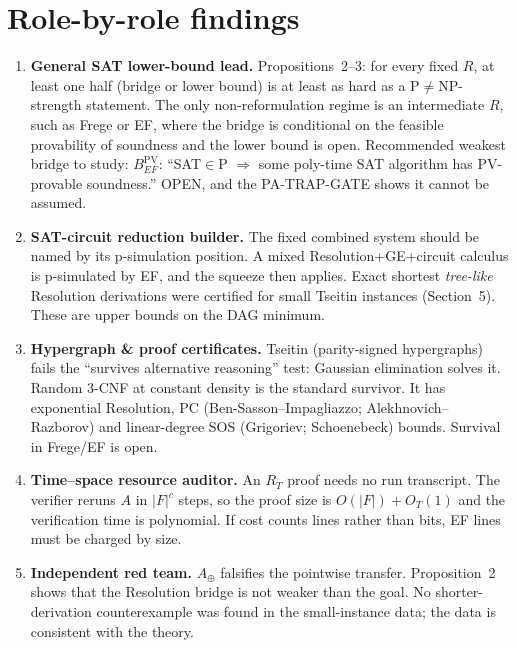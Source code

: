 \documentclass[11pt]{article}
\begin{document}
\section{Role-by-role findings}
\begin{enumerate}
\item \textbf{General SAT lower-bound lead.} Propositions~2--3: for every fixed $R$, at least one half
(bridge or lower bound) is at least as hard as a P${}\ne{}$NP-strength statement. The only non-reformulation
regime is an intermediate $R$, such as Frege or EF, where the bridge is conditional on the feasible provability
of soundness and the lower bound is open. Recommended weakest bridge to study:
$B^{\mathrm{PV}}_{EF}$: ``SAT${}\in{}$P $\Rightarrow$ some poly-time SAT algorithm has PV-provable soundness.''
OPEN, and the PA-TRAP-GATE shows it cannot be assumed.
\item \textbf{SAT-circuit reduction builder.} The fixed combined system should be named by its
p-simulation position. A mixed Resolution+GE+circuit calculus is p-simulated by EF, and the squeeze then applies.
Exact shortest \emph{tree-like} Resolution derivations were certified for small Tseitin instances
(Section~5). These are upper bounds on the DAG minimum.
\item \textbf{Hypergraph \& proof certificates.} Tseitin (parity-signed hypergraphs) fails the
``survives alternative reasoning'' test: Gaussian elimination solves it. Random 3-CNF at constant density is
the standard survivor. It has exponential Resolution, PC (Ben-Sasson--Impagliazzo; Alekhnovich--Razborov)
and linear-degree SOS (Grigoriev; Schoenebeck) bounds. Survival in Frege/EF is open.
\item \textbf{Time--space resource auditor.} An $R_T$ proof needs no run transcript. The verifier reruns
$A$ in $|F|^{c}$ steps, so the proof size is $O(|F|)+O_T(1)$ and the verification time is polynomial.
If cost counts lines rather than bits, EF lines must be charged by size.
\item \textbf{Independent red team.} $A_\oplus$ falsifies the pointwise transfer. Proposition~2 shows that
the Resolution bridge is not weaker than the goal. No shorter-derivation counterexample was found in the
small-instance data; the data is consistent with the theory.
\end{enumerate}
\end{document}
